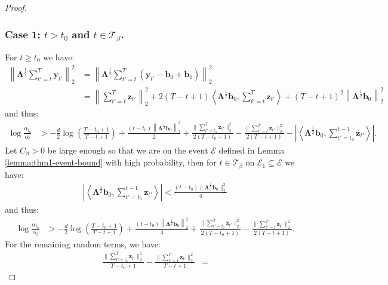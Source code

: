 \begin{proof}
\subsubsection*{Case 1: $t > t_0$ and $t\in\mathcal{T}_\beta$.}

For $t \geq t_0$ we have:
\begin{align*}
    \left\lVert\boldsymbol{\Lambda}^{\frac{1}{2}} \sum_{t'=t}^T\mathbf{y}_{t'}\right\rVert_2^2 &= \left\lVert\boldsymbol{\Lambda}^{\frac{1}{2}} \sum_{t'=t}^T(\mathbf{y}_{t'} - \mathbf{b}_0 + \mathbf{b}_0)\right\rVert_2^2 \\
    &= \left\lVert \sum_{t'=t}^T \mathbf{z}_{t'}\right\rVert_2^2 + 2(T-t+1) \left\langle\boldsymbol{\Lambda}^{\frac{1}{2}}\mathbf{b}_0, \sum_{t'=t}^T\mathbf{z}_{t'} \right\rangle + (T-t+1)^2\left\lVert\boldsymbol{\Lambda}^{\frac{1}{2}}\mathbf{b}_0\right\rVert_2^2 
\end{align*}
and thus:
\begin{align*}
    \log \frac{\alpha_{t_0}}{\alpha_t} &> -\frac{d}{2}\log\left(\frac{T-t_0+1}{T-t+1}\right) +\frac{(t-t_0)\left\lVert\boldsymbol{\Lambda}^{\frac{1}{2}}\mathbf{b}_0\right\rVert_2^2}{2} + \frac{\lVert\sum_{t'=t_0}^T\mathbf{z}_{t'}\rVert_2^2}{2(T-t_0+1)} - \frac{\lVert\sum_{t'=t}^T\mathbf{z}_{t'}\rVert_2^2}{2(T-t+1)} - \left| \left\langle\boldsymbol{\Lambda}^{\frac{1}{2}}\mathbf{b}_0, \sum_{t'=t_0}^{t-1}\mathbf{z}_{t'} \right\rangle\right|. 
\end{align*}
Let $C_\beta > 0$ be large enough so that we are on the event $\mathcal{E}$ defined in Lemma \ref{lemma:thm1-event-bound} with high probability, then for $t \in \mathcal{T}_\beta$ on $\mathcal{E}_1\subseteq\mathcal{E}$ we have:
\begin{align*}
    \left|\left\langle\boldsymbol{\Lambda}^{\frac{1}{2}}\mathbf{b}_0, \sum_{t'=t_0}^{t-1}\mathbf{z}_{t'} \right\rangle\right| < \frac{(t-t_0) \lVert\boldsymbol{\Lambda}^{\frac{1}{2}} \mathbf{b}_0\rVert_2^2}{4}
\end{align*}
and thus:
\begin{align}
    \log \frac{\alpha_{t_0}}{\alpha_t} &> -\frac{d}{2}\log\left(\frac{T-t_0+1}{T-t+1}\right) +\frac{(t-t_0)\left\lVert\boldsymbol{\Lambda}^{\frac{1}{2}}\mathbf{b}_0\right\rVert_2^2}{4} + \frac{\lVert\sum_{t'=t_0}^T\mathbf{z}_{t'}\rVert_2^2}{2(T-t_0+1)} - \frac{\lVert\sum_{t'=t}^T\mathbf{z}_{t'}\rVert_2^2}{2(T-t+1)}.\label{eq:thm1-bd1}
\end{align}
For the remaining random terms, we have:
\small
\begin{align}
    \frac{\lVert\sum_{t'=t_0}^T\mathbf{z}_{t'}\rVert_2^2}{T-t_0+1} - \frac{\lVert\sum_{t'=t}^T\mathbf{z}_{t'}\rVert_2^2}{T-t+1} &=

\end{align}
\end{proof}
